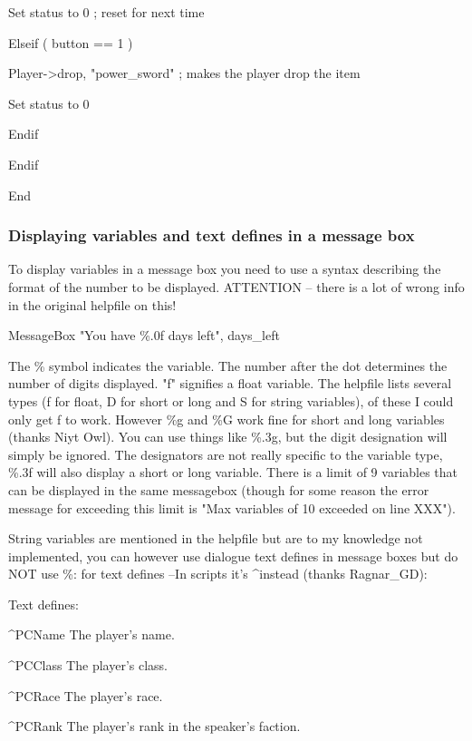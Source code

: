 \documentclass[
]{article}
\begin{document}
Set status to 0 ; reset for next time

Elseif ( button == 1 )

Player-\textgreater drop, "power\_sword" ; makes the player drop the
item

Set status to 0

Endif

Endif

End

\hypertarget{displaying-variables-and-text-defines-in-a-message-box}{%
\subsubsection{Displaying variables and text defines in a message
box}\label{displaying-variables-and-text-defines-in-a-message-box}}

To display variables in a message box you need to use a syntax
describing the format of the number to be displayed. ATTENTION -- there
is a lot of wrong info in the original helpfile on this!

MessageBox "You have \%.0f days left", days\_left

The \% symbol indicates the variable. The number after the dot
determines the number of digits displayed. "f" signifies a float
variable. The helpfile lists several types (f for float, D for short or
long and S for string variables), of these I could only get f to work.
However \%g and \%G work fine for short and long variables (thanks Niyt
Owl). You can use things like \%.3g, but the digit designation will
simply be ignored. The designators are not really specific to the
variable type, \%.3f will also display a short or long variable. There
is a limit of 9 variables that can be displayed in the same messagebox
(though for some reason the error message for exceeding this limit is
"Max variables of 10 exceeded on line XXX").

String variables are mentioned in the helpfile but are to my knowledge
not implemented, you can however use dialogue text defines in message
boxes but do NOT use \%: for text defines --In scripts it's \^{}instead
(thanks Ragnar\_GD):

Text defines:

\^{}PCName The player's name.

\^{}PCClass The player's class.

\^{}PCRace The player's race.

\^{}PCRank The player's rank in the speaker's faction.
\end{document}
